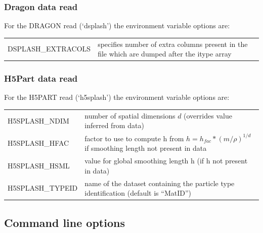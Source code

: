 \documentclass[a4paper,10pt]{article}
\begin{document}
\subsubsection{ Dragon data read}
 For the DRAGON read (`dsplash') the environment variable options are:\newline

\begin{tabular}{p{}p{}}
DSPLASH\_EXTRACOLS & specifies number of extra columns present in the file which are dumped after the itype array
\end{tabular}

\subsubsection{ H5Part data read}
 For the H5PART read (`h5splash') the environment variable options are:\newline

\begin{tabular}{p{}p{}}
H5SPLASH\_NDIM & number of spatial dimensions $d$ (overrides value inferred from data) \\
H5SPLASH\_HFAC & factor to use to compute h from $h = h_{fac} *(m/\rho)^{1/d}$ if smoothing length not present in data \\
H5SPLASH\_HSML & value for global smoothing length h (if h not present in data) \\
H5SPLASH\_TYPEID & name of the dataset containing the particle type identification (default is ``MatID'')
\end{tabular}


\subsection{Command line options}
\label{sec:commandline}
\end{document}
